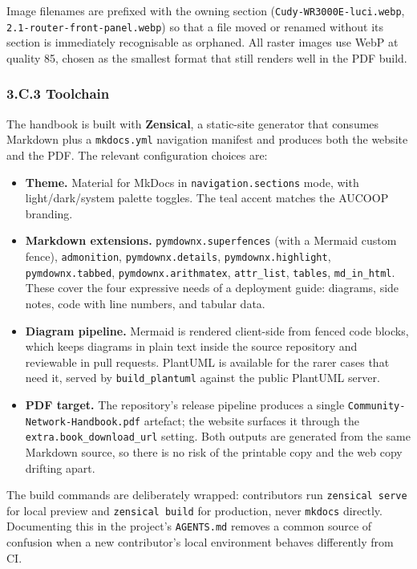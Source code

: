 Image filenames are prefixed with the owning section
(\texttt{Cudy-WR3000E-luci.webp}, \texttt{2.1-router-front-panel.webp})
so that a file moved or renamed without its section is immediately
recognisable as orphaned. All raster images use WebP at quality 85,
chosen as the smallest format that still renders well in the PDF build.

\hypertarget{c.3-toolchain}{%
\subsubsection{3.C.3 Toolchain}\label{c.3-toolchain}}

The handbook is built with \textbf{Zensical}, a static-site generator
that consumes Markdown plus a \texttt{mkdocs.yml} navigation manifest
and produces both the website and the PDF. The relevant configuration
choices are:

\begin{itemize}
\tightlist
\item
  \textbf{Theme.} Material for MkDocs in \texttt{navigation.sections}
  mode, with light/dark/system palette toggles. The teal accent matches
  the AUCOOP branding.
\item
  \textbf{Markdown extensions.} \texttt{pymdownx.superfences} (with a
  Mermaid custom fence), \texttt{admonition}, \texttt{pymdownx.details},
  \texttt{pymdownx.highlight}, \texttt{pymdownx.tabbed},
  \texttt{pymdownx.arithmatex}, \texttt{attr\_list}, \texttt{tables},
  \texttt{md\_in\_html}. These cover the four expressive needs of a
  deployment guide: diagrams, side notes, code with line numbers, and
  tabular data.
\item
  \textbf{Diagram pipeline.} Mermaid is rendered client-side from fenced
  code blocks, which keeps diagrams in plain text inside the source
  repository and reviewable in pull requests. PlantUML is available for
  the rarer cases that need it, served by \texttt{build\_plantuml}
  against the public PlantUML server.
\item
  \textbf{PDF target.} The repository's release pipeline produces a
  single \texttt{Community-Network-Handbook.pdf} artefact; the website
  surfaces it through the \texttt{extra.book\_download\_url} setting.
  Both outputs are generated from the same Markdown source, so there is
  no risk of the printable copy and the web copy drifting apart.
\end{itemize}

The build commands are deliberately wrapped: contributors run
\texttt{zensical\ serve} for local preview and \texttt{zensical\ build}
for production, never \texttt{mkdocs} directly. Documenting this in the
project's \texttt{AGENTS.md} removes a common source of confusion when a
new contributor's local environment behaves differently from CI.

